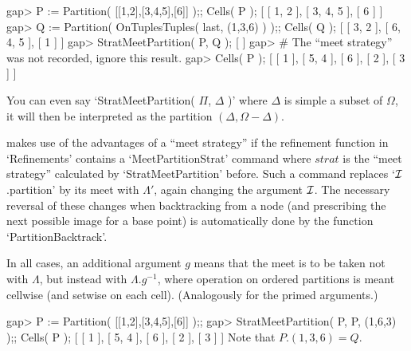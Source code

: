 

\beginexample
gap> P := Partition( [[1,2],[3,4,5],[6]] );;  Cells( P );
[ [ 1, 2 ], [ 3, 4, 5 ], [ 6 ] ]
gap> Q := Partition( OnTuplesTuples( last, (1,3,6) ) );;  Cells( Q );
[ [ 3, 2 ], [ 6, 4, 5 ], [ 1 ] ]
gap> StratMeetPartition( P, Q );
[  ]
gap> # The ``meet strategy'' was not recorded, ignore this result.
gap> Cells( P );
[ [ 1 ], [ 5, 4 ], [ 6 ], [ 2 ], [ 3 ] ]
\endexample

You can even say  `StratMeetPartition( $\Pi$, $\Delta$ )'  where $\Delta$
is simple  a subset  of  $\Omega$, it   will then  be interpreted as  the
partition $(\Delta,\Omega-\Delta)$.

{\GAP} makes use   of  the advantages  of   a ``meet  strategy''  if  the
refinement   function  in `Refinements'  contains  a `MeetPartitionStrat'
command where   $strat$  is   the    ``meet  strategy''  calculated    by
`StratMeetPartition' before.  Such a command replaces `${\cal I}$.partition' by
its meet with $\Lambda'$, again changing the argument ${\cal I}$. The necessary
reversal of these changes when backtracking from  a node (and prescribing
the next possible image  for a base point) is  automatically done by  the
function `PartitionBacktrack'.

In  all cases, an additional  argument $g$ means that the   meet is to be
taken  not with $\Lambda$,   but  instead with $\Lambda.{g^{-1}}$,  where
operation  on ordered partitions is  meant cellwise  (and setwise on each
cell). (Analogously for the primed arguments.)

\beginexample
gap> P := Partition( [[1,2],[3,4,5],[6]] );;
gap> StratMeetPartition( P, P, (1,6,3) );;  Cells( P );
[ [ 1 ], [ 5, 4 ], [ 6 ], [ 2 ], [ 3 ] ]
\endexample
Note that $P.(1,3,6) = Q$.

